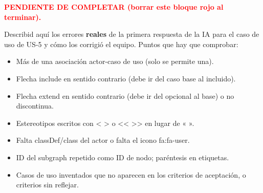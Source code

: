 \textcolor{red}{\textbf{PENDIENTE DE COMPLETAR (borrar este bloque rojo al terminar).}}

Describid aquí los errores \textbf{reales} de la primera respuesta de la IA para el caso de uso de US-5 y cómo los corrigió el equipo. Puntos que hay que comprobar:
\begin{itemize}[leftmargin=*,nosep]
\item Más de una asociación actor-caso de uso (solo se permite una).
\item Flecha include en sentido contrario (debe ir del caso base al incluido).
\item Flecha extend en sentido contrario (debe ir del opcional al base) o no discontinua.
\item Estereotipos escritos con < > o << >> en lugar de « ».
\item Falta classDef/class del actor o falta el icono fa:fa-user.
\item ID del subgraph repetido como ID de nodo; paréntesis en etiquetas.
\item Casos de uso inventados que no aparecen en los criterios de aceptación, o criterios sin reflejar.
\end{itemize}
